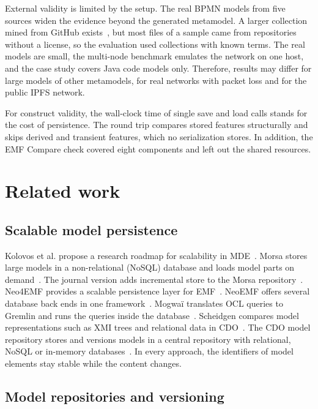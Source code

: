 \documentclass[5p,times,twocolumn]{elsarticle}
\theoremstyle{definition}
\theoremstyle{plain}
\begin{document}
External validity is limited by the setup. The real BPMN models from five sources widen the evidence beyond the generated metamodel. A larger collection mined from GitHub exists~\cite{turker2022bpmn}, but most files of a sample came from repositories without a license, so the evaluation used collections with known terms. The real models are small, the multi-node benchmark emulates the network on one host, and the case study covers Java code models only. Therefore, results may differ for large models of other metamodels, for real networks with packet loss and for the public IPFS network.

For construct validity, the wall-clock time of single save and load calls stands for the cost of persistence. The round trip compares stored features structurally and skips derived and transient features, which no serialization stores. In addition, the EMF Compare check covered eight components and left out the shared resources.

\section{Related work}\label{sec:related}

\subsection{Scalable model persistence}\label{sec:related-persistence}

Kolovos et al. propose a research roadmap for scalability in MDE~\cite{kolovos2013roadmap}. Morsa stores large models in a non-relational (NoSQL) database and loads model parts on demand~\cite{pagan2011morsa}. The journal version adds incremental store to the Morsa repository~\cite{pagan2015repository}. Neo4EMF provides a scalable persistence layer for EMF~\cite{benelallam2014neo4emf}. NeoEMF offers several database back ends in one framework~\cite{daniel2017neoemf}. Mogwaï translates OCL queries to Gremlin and runs the queries inside the database~\cite{daniel2016mogwai}. Scheidgen compares model representations such as XMI trees and relational data in CDO~\cite{scheidgen2013reference}. The CDO model repository stores and versions models in a central repository with relational, NoSQL or in-memory databases~\cite{cdo}. In every approach, the identifiers of model elements stay stable while the content changes.

\subsection{Model repositories and versioning}\label{sec:related-versioning}
\end{document}
